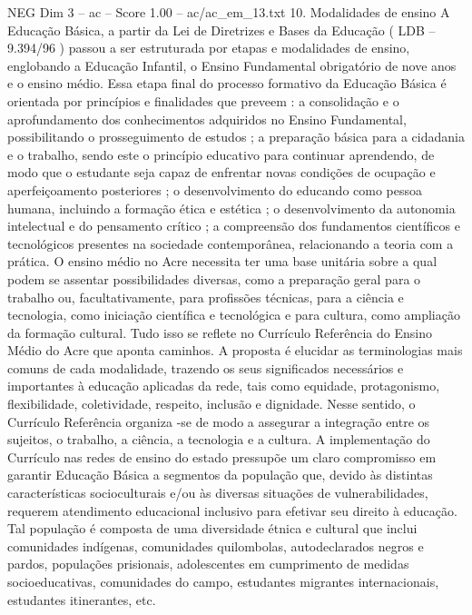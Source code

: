 \begin{textsample}{NEG Dim 3 – ac – Score 1.00 – ac/ac\_em\_13.txt}  \label{ex:f3_neg_270}
10.
Modalidades de ensino A Educação Básica, a partir da Lei de Diretrizes e Bases da Educação ( LDB – 9.394/96 ) passou a ser estruturada por etapas e modalidades de ensino, englobando a Educação Infantil, o Ensino Fundamental obrigatório de nove anos e o ensino médio.
Essa etapa final do processo formativo da Educação Básica é orientada por princípios e finalidades que preveem : a consolidação e o aprofundamento dos conhecimentos adquiridos no Ensino Fundamental, possibilitando o prosseguimento de estudos ; a preparação básica para a cidadania e o trabalho, sendo este o princípio educativo para continuar aprendendo, de modo que o estudante seja capaz de enfrentar novas condições de ocupação e aperfeiçoamento posteriores ; o desenvolvimento do educando como pessoa humana, incluindo a formação ética e estética ; o desenvolvimento da autonomia intelectual e do pensamento crítico ; a compreensão dos fundamentos científicos e tecnológicos presentes na sociedade contemporânea, relacionando a teoria com a prática.
O ensino médio no Acre necessita ter uma base unitária sobre a qual podem se assentar possibilidades diversas, como a preparação geral para o trabalho ou, facultativamente, para profissões técnicas, para a ciência e tecnologia, como iniciação científica e tecnológica e para cultura, como ampliação da formação cultural.
Tudo isso se reflete no Currículo Referência do Ensino Médio do Acre que aponta caminhos.
A proposta é elucidar as terminologias mais comuns de cada modalidade, trazendo os seus significados necessários e importantes à educação aplicadas da rede, tais como equidade, protagonismo, flexibilidade, coletividade, respeito, inclusão e dignidade.
Nesse sentido, o Currículo Referência organiza -se de modo a assegurar a integração entre os sujeitos, o trabalho, a ciência, a tecnologia e a cultura.
A implementação do Currículo nas redes de ensino do estado pressupõe um claro compromisso em garantir Educação Básica a segmentos da população que, devido às distintas características socioculturais e/ou às diversas situações de vulnerabilidades, requerem atendimento educacional inclusivo para efetivar seu direito à educação.
Tal população é composta de uma diversidade étnica e cultural que inclui comunidades indígenas, comunidades quilombolas, autodeclarados negros e pardos, populações prisionais, adolescentes em cumprimento de medidas socioeducativas, comunidades do campo, estudantes migrantes internacionais, estudantes itinerantes, etc.

\end{textsample}
